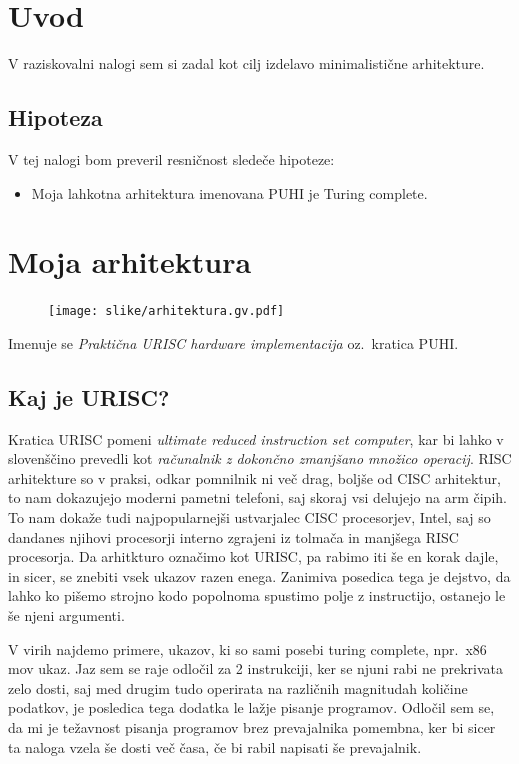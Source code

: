 \documentclass[12pt]{article}
\begin{document}
\section{Uvod}
V raziskovalni nalogi sem si zadal kot cilj izdelavo minimalistične arhitekture.

\subsection{Hipoteza}
V tej nalogi bom preveril resničnost sledeče hipoteze:
\begin{itemize}
  \item Moja lahkotna arhitektura imenovana PUHI je Turing complete.
\end{itemize}

\section{Moja arhitektura}
\begin{figure}[h]
  \centering
  \texttt{[image: slike/arhitektura.gv.pdf]}
\end{figure}
Imenuje se \textit{Praktična URISC hardware implementacija} oz.\ kratica PUHI.\@
\subsection{Kaj je URISC?}
Kratica URISC pomeni \textit{ultimate reduced instruction set computer}, kar bi lahko v slovenščino prevedli kot \textit{računalnik z dokončno zmanjšano množico operacij}.
RISC arhitekture so v praksi, odkar pomnilnik ni več drag, boljše od CISC arhitektur, to nam dokazujejo moderni pametni telefoni, saj skoraj vsi delujejo na arm čipih.
To nam dokaže tudi najpopularnejši ustvarjalec CISC procesorjev, Intel, saj so dandanes njihovi procesorji interno zgrajeni iz tolmača in manjšega RISC procesorja.
Da arhitkturo označimo kot URISC, pa rabimo iti še en korak dajle, in sicer, se znebiti vsek ukazov razen enega.
Zanimiva posedica tega je dejstvo, da lahko ko pišemo strojno kodo popolnoma spustimo polje z instructijo, ostanejo le še njeni argumenti.

V virih najdemo primere, ukazov, ki so sami posebi turing complete, npr.\ x86 mov ukaz.
Jaz sem se raje odločil za 2 instrukciji, ker se njuni rabi ne prekrivata zelo dosti, saj med drugim tudo operirata na različnih magnitudah količine podatkov, je posledica tega dodatka le lažje pisanje programov.
Odločil sem se, da mi je težavnost pisanja programov brez prevajalnika pomembna, ker bi sicer ta naloga vzela še dosti več časa, če bi rabil napisati še prevajalnik.
\end{document}
